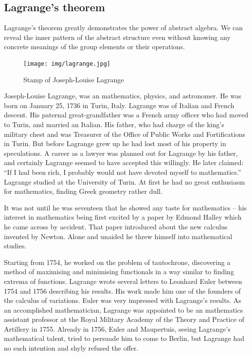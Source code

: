 \documentclass[b5paper]{article}
\begin{document}
\begin{Exercise}
\end{Exercise}

\subsection{Lagrange's theorem}

Lagrange's theorem greatly demonstrates the power of abstract algebra. We can reveal the inner pattern of the abstract structure even without knowing any concrete meanings of the group elements or their operations.

\begin{figure}
 \centering
 \texttt{[image: img/lagrange.jpg]}
 \captionsetup{labelformat=empty}
 \caption{Stamp of Joseph-Louise Lagrange}
 \label{fig:Lagrange}
\end{figure}

Joseph-Louise Lagrange, was an mathematics, physics, and astronomer. He was born on January 25, 1736 in Turin, Italy. Lagrange was of Italian and French descent. His paternal great-grandfather was a French army officer who had moved to Turin, and married an Italian. His father, who had charge of the king's military chest and was Treasurer of the Office of Public Works and Fortifications in Turin. But before Lagrange grew up he had lost most of his property in speculations. A career as a lawyer was planned out for Lagrange by his father, and certainly Lagrange seemed to have accepted this willingly. He later claimed: ``If I had been rich, I probably would not have devoted myself to mathematics.'' Lagrange studied at the University of Turin. At first he had no great enthusiasm for mathematics, finding Greek geometry rather dull.

It was not until he was seventeen that he showed any taste for mathematics – his interest in mathematics being first excited by a paper by Edmond Halley which he came across by accident. That paper introduced about the new calculus invented by Newton. Alone and unaided he threw himself into mathematical studies.

Starting from 1754, he worked on the problem of tautochrone, discovering a method of maximising and minimising functionals in a way similar to finding extrema of functions. Lagrange wrote several letters to Leonhard Euler between 1754 and 1756 describing his results. His work made him one of the founders of the calculus of variations. Euler was very impressed with Lagrange's results. As an accomplished mathematician, Lagrange was appointed to be an mathematics assistant professor at the Royal Military Academy of the Theory and Practice of Artillery in 1755. Already in 1756, Euler and Maupertuis, seeing Lagrange's mathematical talent, tried to persuade him to come to Berlin, but Lagrange had no such intention and shyly refused the offer.
\end{document}
